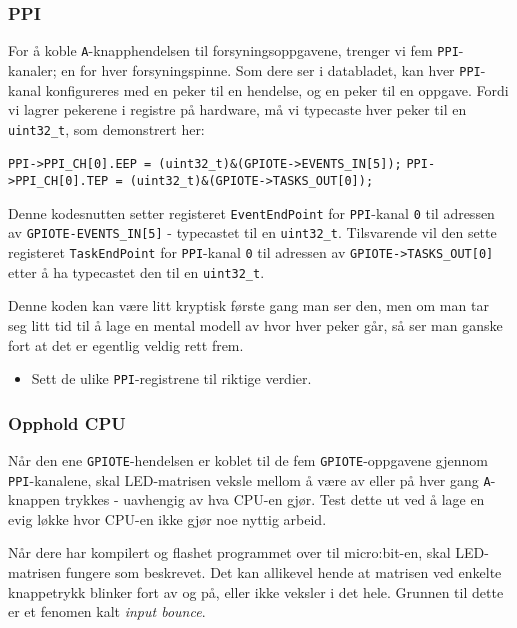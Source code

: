 \subsubsection{PPI}

For å koble \verb|A|-knapphendelsen til forsyningsoppgavene, trenger vi fem \verb|PPI|-kanaler; en for hver forsyningspinne. Som dere ser i databladet, kan hver \verb|PPI|-kanal konfigureres med en peker til en hendelse, og en peker til en oppgave. Fordi vi lagrer pekerene i registre på hardware, må vi typecaste hver peker til en \texttt{uint32\_t}, som demonstrert her:

\verb|PPI->PPI_CH[0].EEP = (uint32_t)&(GPIOTE->EVENTS_IN[5]);|\newline
\verb|PPI->PPI_CH[0].TEP = (uint32_t)&(GPIOTE->TASKS_OUT[0]);|


Denne kodesnutten setter registeret \verb|EventEndPoint| for \verb|PPI|-kanal \verb|0| til adressen av \verb|GPIOTE-EVENTS_IN[5]| - typecastet til en \verb|uint32_t|. Tilsvarende vil den sette registeret \verb|TaskEndPoint| for \verb|PPI|-kanal \verb|0| til adressen av \verb|GPIOTE->TASKS_OUT[0]| etter å ha typecastet den til en \verb|uint32_t|.


Denne koden kan være litt kryptisk første gang man ser den, men om man tar seg litt tid til å lage en mental modell av hvor hver peker går, så ser man ganske fort at det er egentlig veldig rett frem.

\begin{itemize}
    \item Sett de ulike \verb|PPI|-registrene til riktige verdier.
\end{itemize}





\subsubsection{Opphold CPU}

Når den ene \verb|GPIOTE|-hendelsen er koblet til de fem \verb|GPIOTE|-oppgavene gjennom \verb|PPI|-kanalene, skal LED-matrisen veksle mellom å være av eller på hver gang \verb|A|-knappen trykkes - uavhengig av hva CPU-en gjør. Test dette ut ved å lage en evig løkke hvor CPU-en ikke gjør noe nyttig arbeid.

Når dere har kompilert og flashet programmet over til micro:bit-en, skal LED-matrisen fungere som beskrevet. Det kan allikevel hende at matrisen ved enkelte knappetrykk blinker fort av og på, eller ikke veksler i det hele. Grunnen til dette er et fenomen kalt \textit{input bounce}.

